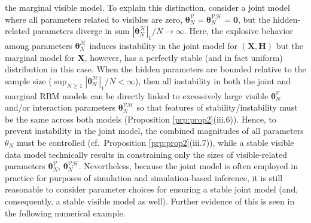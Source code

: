 \documentclass[numbib]{imamat}
\theoremstyle{theorem}
\theoremstyle{lemma}
\theoremstyle{example}
\theoremstyle{corollary}
\theoremstyle{definition}
\theoremstyle{remark}
\theoremstyle{approximation}
\theoremstyle{scheme}
\begin{document}
the marginal visible model. To explain this distinction, consider a joint model where all parameters related to visibles are zero, \(\boldsymbol \theta_N^{\mathcal{V}}= \boldsymbol \theta_N^{\mathcal{VH}}=\boldsymbol 0\), but the hidden-related parameters diverge in sum \(|\boldsymbol \theta_N^{\mathcal{H}}|_1/N\to \infty\). Here, the explosive behavior among parameters \(\boldsymbol \theta_N^{\mathcal{H}}\) induces instability in the joint model for \((\boldsymbol X, \boldsymbol H)\) but the marginal model for \(\boldsymbol X\), however, has a perfectly stable (and in fact uniform) distribution in this case. When the hidden parameters are bounded relative to the sample size (\(\sup_{N\geq 1} |\boldsymbol \theta_N^{\mathcal{H}}|_1/N<\infty\)), then all instability in both the joint and marginal RBM models can be directly linked to excessively large visible \(\boldsymbol \theta_N^{\mathcal{V}}\) and/or interaction parameters \(\boldsymbol \theta_N^{\mathcal{VH}}\) so that features of stability/instability must be the same across both models (Proposition \ref{prp:prop2}(iii.6)). Hence, to prevent instability in the joint model, the combined magnitudes of all parameters \(\theta_N\) must be controlled (cf.~Proposition \ref{prp:prop2}(iii.7)), while a stable visible data model technically results in constraining only the sizes of visible-related parameters \(\boldsymbol \theta_N^{\mathcal{V}}\), \(\boldsymbol \theta_N^{\mathcal{VH}}\). Nevertheless, because the joint model is often employed in practice for purposes of simulation and simulation-based inference, it is still reasonable to consider parameter choices for ensuring a stable joint model (and, consequently, a stable visible model as well). Further evidence of this is seen in the following numerical example.
\end{document}
